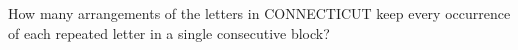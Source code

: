 How many arrangements of the letters in CONNECTICUT keep every occurrence of each repeated letter in a single consecutive block?

